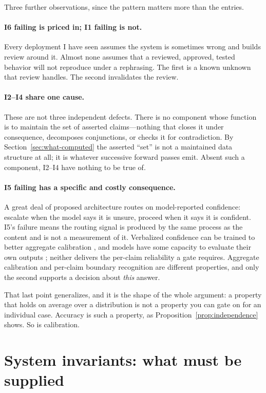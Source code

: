 Three further observations, since the pattern matters more than the entries.

\paragraph{I6 failing is priced in; I1 failing is not.} Every deployment I have
seen assumes the system is sometimes wrong and builds review around it. Almost none
assumes that a reviewed, approved, tested behavior will not reproduce under a
rephrasing. The first is a known unknown that review handles. The second
invalidates the review.

\paragraph{I2--I4 share one cause.} These are not three independent defects. There
is no component whose function is to maintain the set of asserted claims---nothing
that closes it under consequence, decomposes conjunctions, or checks it for
contradiction. By Section~\ref{sec:what-computed} the asserted ``set'' is not a
maintained data structure at all; it is whatever successive forward passes emit.
Absent such a component, I2--I4 have nothing to be true of.

\paragraph{I5 failing has a specific and costly consequence.} A great deal of
proposed architecture routes on model-reported confidence: escalate when the model
says it is unsure, proceed when it says it is confident. I5's failure means the
routing signal is produced by the same process as the content and is not a
measurement of it. Verbalized confidence can be trained to better aggregate
calibration \citep{lin2022}, and models have some capacity to evaluate their own
outputs \citep{kadavath2022}; neither delivers the per-claim reliability a gate
requires. Aggregate calibration and per-claim boundary recognition are different
properties, and only the second supports a decision about \emph{this} answer.

That last point generalizes, and it is the shape of the whole argument: a property
that holds on average over a distribution is not a property you can gate on for an
individual case. Accuracy is such a property, as
Proposition~\ref{prop:independence} shows. So is calibration.

\section{System invariants: what must be supplied}

